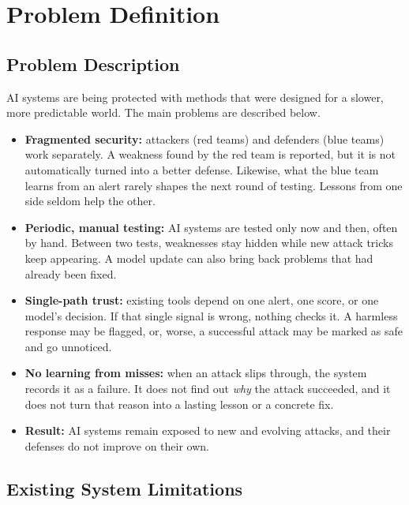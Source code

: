 \chapter{Problem Definition}
\label{ch:problem}

\section{Problem Description}

AI systems are being protected with methods that were designed for a slower,
more predictable world. The main problems are described below.

\begin{itemize}
  \item \textbf{Fragmented security:} attackers (red teams) and defenders (blue
  teams) work separately. A weakness found by the red team is reported, but it is
  not automatically turned into a better defense. Likewise, what the blue team
  learns from an alert rarely shapes the next round of testing. Lessons from one
  side seldom help the other.

  \item \textbf{Periodic, manual testing:} AI systems are tested only now and
  then, often by hand. Between two tests, weaknesses stay hidden while new attack
  tricks keep appearing. A model update can also bring back problems that had
  already been fixed.

  \item \textbf{Single-path trust:} existing tools depend on one alert, one score,
  or one model's decision. If that single signal is wrong, nothing checks it. A
  harmless response may be flagged, or, worse, a successful attack may be marked
  as safe and go unnoticed.

  \item \textbf{No learning from misses:} when an attack slips through, the
  system records it as a failure. It does not find out \emph{why} the attack
  succeeded, and it does not turn that reason into a lasting lesson or a concrete
  fix.

  \item \textbf{Result:} AI systems remain exposed to new and evolving attacks,
  and their defenses do not improve on their own.
\end{itemize}

\section{Existing System Limitations}

